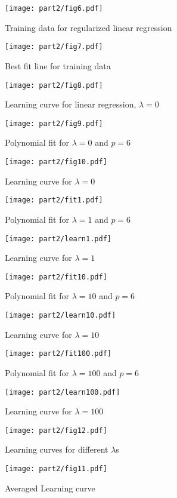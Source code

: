 \documentclass[pdftex,11pt]{article}
\begin{document}
\begin{figure}[H]
  \caption{Training data for regularized linear regression}
  \centering
    \texttt{[image: part2/fig6.pdf]}
\end{figure}
\begin{figure}[H]
  \caption{Best fit line for training data}
  \centering
    \texttt{[image: part2/fig7.pdf]}
\end{figure}
\begin{figure}[H]
  \caption{Learning curve for linear regression, $\lambda=0$}
  \centering
    \texttt{[image: part2/fig8.pdf]}
\end{figure}

\pagebreak
\begin{figure}[H]
  \caption{Polynomial fit for $\lambda=0$ and $p=6$}
  \centering
    \texttt{[image: part2/fig9.pdf]}
\end{figure}
\begin{figure}[H]
  \caption{Learning curve for $\lambda=0$}
  \centering
    \texttt{[image: part2/fig10.pdf]}
\end{figure}
\begin{figure}[H]
\caption{Polynomial fit for $\lambda=1$ and $p=6$}
\label{fig:fit1}
  \centering
\texttt{[image: part2/fit1.pdf]}
\end{figure}
\begin{figure}[H]
\caption{Learning curve for $\lambda=1$}
  \centering
\texttt{[image: part2/learn1.pdf]}
\end{figure}
\begin{figure}[H]
\caption{Polynomial fit for $\lambda=10$ and $p=6$}
  \centering
\texttt{[image: part2/fit10.pdf]}
\end{figure}
\begin{figure}[H]
\caption{Learning curve for $\lambda=10$}
  \centering
\texttt{[image: part2/learn10.pdf]}
\end{figure}
\begin{figure}[H]
\caption{Polynomial fit for $\lambda=100$ and $p=6$}
  \centering
\texttt{[image: part2/fit100.pdf]}
\end{figure}
\begin{figure}[H]
\caption{Learning curve for $\lambda=100$}
  \label{fig:learn100}
  \centering
\texttt{[image: part2/learn100.pdf]}
\end{figure}


\begin{figure}[H]
\caption{Learning curves for different $\lambda$s}
  \label{fig:bestlambda}
  \centering
\texttt{[image: part2/fig12.pdf]}
\end{figure}

\begin{figure}[H]
\caption{Averaged Learning curve}
  \label{fig:avglearn}
  \centering
\texttt{[image: part2/fig11.pdf]}
\end{figure}
\fi
\end{document}
